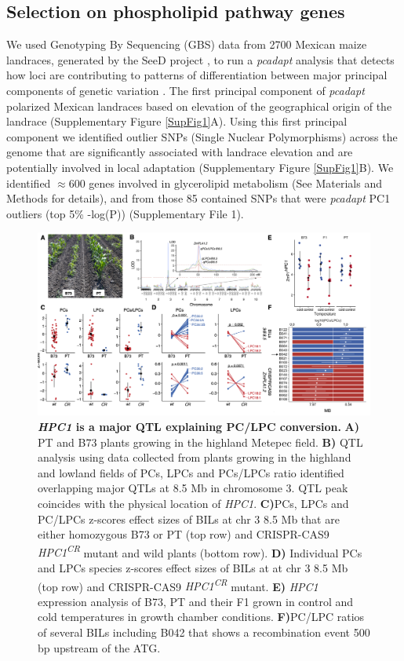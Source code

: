 \documentclass[9pt,twocolumn,twoside,lineno]{BioRxiv}
\begin{document}
\subsection{Selection on phospholipid pathway genes} 
We used Genotyping By Sequencing (GBS) data from 2700 Mexican maize landraces, generated by the SeeD project \cite{Romero_Navarro2017-cn, Gates2019-xu}, to run a \textit{pcadapt} analysis that detects how loci are contributing to patterns of differentiation between major principal components of genetic variation \cite{Luu2017-ws}.
The first principal component of \textit{pcadapt} polarized Mexican landraces based on elevation of the geographical origin of the landrace (Supplementary Figure \ref{SupFig1}A).
Using this first principal component we identified outlier SNPs (Single Nuclear Polymorphisms) across the genome that are significantly associated with landrace elevation and are potentially involved in local adaptation (Supplementary Figure \ref{SupFig1}B).
We identified $\approx 600$ genes involved in glycerolipid metabolism (See Materials and Methods for details), and from those 85 contained SNPs that were \textit{pcadapt} PC1 outliers (top 5\% -log(P)) (Supplementary File 1).
\begin{figure}[!ht]
\begin{center}
\includegraphics[width=0.8\paperwidth]{Figures/Fig_3.png}
\caption{\textbf{\textit{HPC1} is a major QTL explaining PC/LPC conversion.} 
\textbf{A)} PT and B73 plants growing in the highland Metepec field. 
\textbf{B)} QTL analysis using data collected from plants growing in the highland and lowland fields of PCs, LPCs and PCs/LPCs ratio identified overlapping major QTLs at 8.5 Mb in chromosome 3. 
QTL peak coincides with the physical location of \textit{HPC1}. 
\textbf{C)}PCs, LPCs and PC/LPCs z-scores effect sizes of BILs at chr 3 8.5 Mb that are either homozygous B73 or PT (top row) and CRISPR-CAS9 \textit{HPC1\textsuperscript{CR}} mutant and wild plants (bottom row).        
\textbf{D)} Individual PCs and LPCs species z-scores effect sizes of BILs at at chr 3 8.5 Mb (top row) and CRISPR-CAS9 \textit{HPC1\textsuperscript{CR}} mutant.
\textbf{E)} \textit{HPC1} expression analysis of B73, PT and their F1 grown in control and cold temperatures in growth chamber conditions.
\textbf{F)}PC/LPC ratios of several BILs including B042 that shows a recombination event 500 bp upstream of the ATG.}
\label{Fig3}
\end{center}
\end{figure} 
\end{document}
